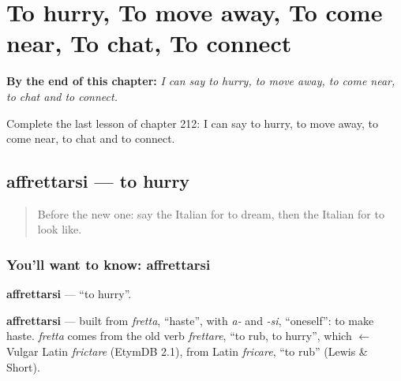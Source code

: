 
\chapter{To hurry, To move away, To come near, To chat, To connect}
\label{ch:it-to-hurry-to-move-away-to-come-near-to-chat-to-connect}

\begin{chapteropening}
\textbf{By the end of this chapter:} \emph{I can say to hurry, to move away, to come near, to chat and to connect.}

Complete the last lesson of chapter 212: I can say to hurry, to move away, to come near, to chat and to connect.
\end{chapteropening}

\section[affrettarsi]{affrettarsi — to hurry}

\label{lesson:IT-C212-affrettarsi}



\begin{quote}
Before the new one: say the Italian for to dream, then the Italian for to look like.
\end{quote}

\subsection*{You'll want to know: affrettarsi}
\textbf{affrettarsi} — \textquotedblleft{}to hurry\textquotedblright{}.

\begin{cousinweb}
\textbf{affrettarsi} — built from \emph{fretta}, \textquotedblleft{}haste\textquotedblright{}, with \emph{a-} and \emph{-si}, \textquotedblleft{}oneself\textquotedblright{}: to make haste. \emph{fretta} comes from the old verb \emph{frettare}, \textquotedblleft{}to rub, to hurry\textquotedblright{}, which $\leftarrow$ Vulgar Latin \emph{frictare} (EtymDB 2.1), from Latin \emph{fricare}, \textquotedblleft{}to rub\textquotedblright{} (Lewis \& Short).
\end{cousinweb}

